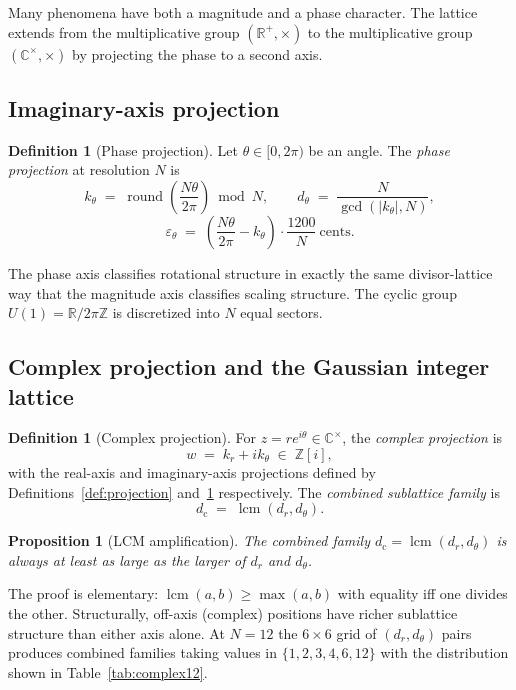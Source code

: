 \documentclass[11pt,a4paper]{article}
\newtheorem{proposition}[theorem]{Proposition}
\theoremstyle{definition}
\newtheorem{definition}[theorem]{Definition}
\theoremstyle{remark}
\newcommand{\R}{\mathbb{R}}
\newcommand{\Z}{\mathbb{Z}}
\newcommand{\C}{\mathbb{C}}
\DeclareMathOperator{\round}{round}
\DeclareMathOperator{\lcm}{lcm}
\newcommand{\eps}{\varepsilon}
\begin{document}
Many phenomena have both a magnitude and a phase character. The lattice extends from the multiplicative group $(\R^{+},\times)$ to the multiplicative group $(\C^{\times},\times)$ by projecting the phase to a second axis.

\subsection{Imaginary-axis projection}

\begin{definition}[Phase projection]\label{def:phase}
Let $\theta\in[0,2\pi)$ be an angle. The \emph{phase projection} at resolution $N$ is
\[
k_{\theta} \;=\; \round\!\left(\frac{N\theta}{2\pi}\right)\bmod N, \qquad d_{\theta} \;=\; \frac{N}{\gcd(|k_{\theta}|,N)},
\]
\[
\eps_{\theta} \;=\; \left(\frac{N\theta}{2\pi}-k_{\theta}\right)\cdot\frac{1200}{N}\ \text{cents}.
\]
\end{definition}

The phase axis classifies rotational structure in exactly the same divisor-lattice way that the magnitude axis classifies scaling structure. The cyclic group $U(1) = \R/2\pi\Z$ is discretized into $N$ equal sectors.

\subsection{Complex projection and the Gaussian integer lattice}

\begin{definition}[Complex projection]\label{def:complex}
For $z = r e^{i\theta}\in\C^{\times}$, the \emph{complex projection} is
\[
w \;=\; k_{r}+i k_{\theta} \;\in\; \Z[i],
\]
with the real-axis and imaginary-axis projections defined by Definitions~\ref{def:projection} and~\ref{def:phase} respectively. The \emph{combined sublattice family} is
\[
d_{\mathrm{c}} \;=\; \lcm(d_{r},d_{\theta}).
\]
\end{definition}

\begin{proposition}[LCM amplification]\label{prop:lcm}
The combined family $d_{\mathrm{c}}=\lcm(d_{r},d_{\theta})$ is always at least as large as the larger of $d_{r}$ and $d_{\theta}$.
\end{proposition}

The proof is elementary: $\lcm(a,b)\ge \max(a,b)$ with equality iff one divides the other. Structurally, off-axis (complex) positions have richer sublattice structure than either axis alone. At $N=12$ the $6\times 6$ grid of $(d_{r},d_{\theta})$ pairs produces combined families taking values in $\{1,2,3,4,6,12\}$ with the distribution shown in Table~\ref{tab:complex12}.
\end{document}
